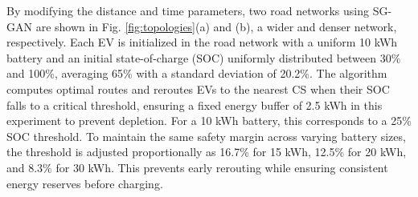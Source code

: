 \documentclass[journal, a4paper, twocolumn]{IEEEtran}
\begin{document}
\begin{table}[htbp]
\centering
\caption{Hyperparameters of the Proposed Strategy}
\label{tab:hyperparameters}
\end{table}

By modifying the distance and time parameters, two road networks using SG-GAN are shown in Fig. \ref{fig:topologies}(a) and (b), a wider and denser network, respectively. Each EV is initialized in the road network with a uniform 10 kWh battery and an initial state-of-charge (SOC) uniformly distributed between 30\% and 100\%, averaging 65\% with a standard deviation of 20.2\%. The algorithm computes optimal routes and reroutes EVs to the nearest CS when their SOC falls to a critical threshold, ensuring a fixed energy buffer of 2.5 kWh in this experiment to prevent depletion. For a 10 kWh battery, this corresponds to a 25\% SOC threshold. To maintain the same safety margin across varying battery sizes, the threshold is adjusted proportionally as 16.7\% for 15 kWh, 12.5\% for 20 kWh, and 8.3\% for 30 kWh. This prevents early rerouting while ensuring consistent energy reserves before charging.
\end{document}
